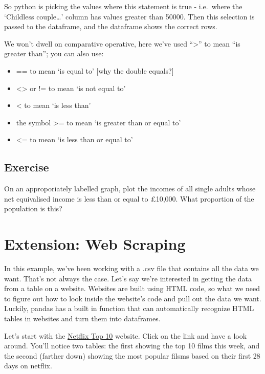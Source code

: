 \documentclass[
  letterpaper,
  DIV=11,
  numbers=noendperiod]{scrreprt}
\providecommand{\tightlist}{%
  \setlength{\itemsep}{0pt}\setlength{\parskip}{0pt}}\usepackage{longtable,booktabs,array}
\begin{document}
So python is picking the values where this statement is true -
i.e.~where the `Childless couple\ldots{}' column has values greater than
50000. Then this selection is passed to the dataframe, and the dataframe
shows the correct rows.

We won't dwell on comparative operative, here we've used
``\textgreater{}'' to mean ``is greater than''; you can also use:

\begin{itemize}
\tightlist
\item
  == to mean `is equal to' {[}why the double equals?{]}
\item
  \textless\textgreater{} or != to mean `is not equal to'
\item
  \textless{} to mean `is less than'
\item
  the symbol \textgreater= to mean `is greater than or equal to'
\item
  \textless= to mean `is less than or equal to'
\end{itemize}

\hypertarget{exercise-2}{%
\section{Exercise}\label{exercise-2}}

On an approporiately labelled graph, plot the incomes of all single
adults whose net equivalised income is less than or equal to £10,000.
What proportion of the population is this?


\hypertarget{extension-web-scraping}{%
\chapter{Extension: Web Scraping}\label{extension-web-scraping}}

In this example, we've been working with a .csv file that contains all
the data we want. That's not always the case. Let's say we're interested
in getting the data from a table on a website. Websites are built using
HTML code, so what we need to figure out how to look inside the
website's code and pull out the data we want. Luckily, pandas has a
built in function that can automatically recognize HTML tables in
websites and turn them into dataframes.

Let's start with the \href{https://top10.netflix.com/}{Netflix Top 10}
website. Click on the link and have a look around. You'll notice two
tables: the first showing the top 10 films this week, and the second
(farther down) showing the most popular filsms based on their first 28
days on netflix.
\end{document}
